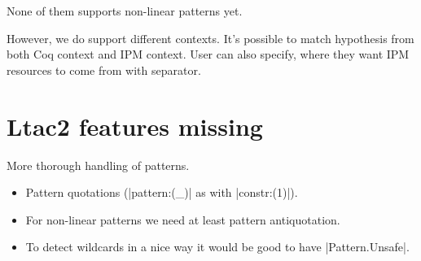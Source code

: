 None of them supports non-linear patterns yet.

However, we do support different contexts.
It's possible to match hypothesis from both Coq context and IPM context.
User can also specify, where they want IPM resources to come from with separator.


\section{Ltac2 features missing}

More thorough handling of patterns.
\begin{itemize}
\item Pattern quotations (\coqe|pattern:(_)| as with \coqe|constr:(1)|).
\item For non-linear patterns we need at least pattern antiquotation.
\item To detect wildcards in a nice way it would be good to have \coqe|Pattern.Unsafe|.
\end{itemize}

